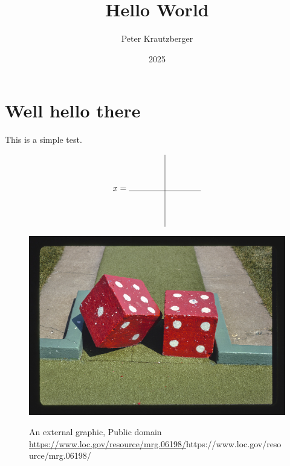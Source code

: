 \documentclass{amsart}
\begin{document}
\title{Hello World}
\author{Peter Krautzberger}
\date{2025}

\maketitle

\section{Well hello there}

This is a simple test.


\begin{equation} \label{tikzPic}
    x = \begin{tikzpicture}[baseline=0pt]
        \draw (-1.5,0) -- (1.5,0);
        \draw (0,-1.5) -- (0,1.5);
    \end{tikzpicture}
\end{equation}
    

\begin{figure}
    \caption{An external graphic, Public domain \url{https://www.loc.gov/resource/mrg.06198/}{https://www.loc.gov/resource/mrg.06198/}}
    \includegraphics[width=.5\linewidth,alt={A photo of a minigolf obstacle consisting of a pair of large, red dice.}]{./Images/service-pnp-mrg-06100-06198v.jpg}
\end{figure}
\end{document}
